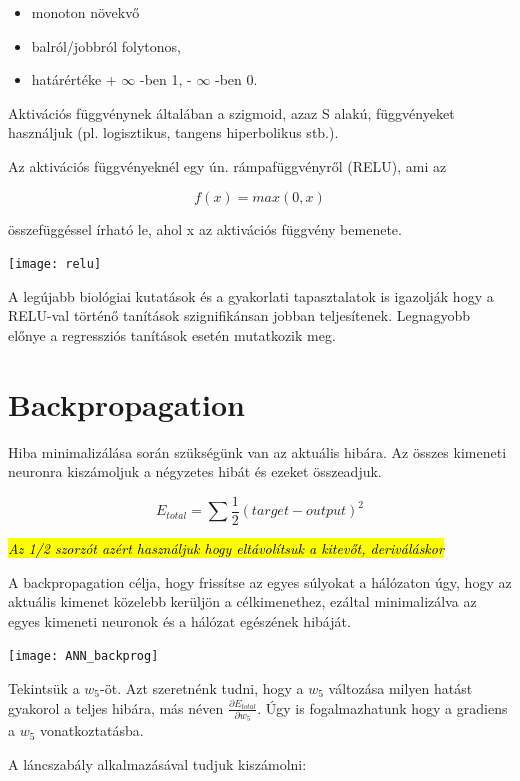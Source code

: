 \begin{itemize}
\item monoton növekvő
\item balról/jobbról folytonos,
\item határértéke + $\infty$ -ben 1, - $\infty$ -ben 0.
\end{itemize}

Aktivációs függvénynek általában a szigmoid, azaz S alakú, függvényeket használjuk (pl. logisztikus, tangens hiperbolikus stb.).

Az aktivációs függvényeknél egy ún. rámpafüggvényről (RELU), ami az

\[ f(x) = max(0,x) \]

összefüggéssel írható le, ahol x az aktivációs függvény bemenete.

\begin{center}
\texttt{[image: relu]}
\end{center}

A legújabb biológiai kutatások és a gyakorlati tapasztalatok is igazolják hogy a RELU-val történő tanítások szignifikánsan jobban teljesítenek. Legnagyobb előnye a regressziós tanítások esetén mutatkozik meg.

\section{Backpropagation}

Hiba minimalizálása során szükségünk van az aktuális hibára. Az összes kimeneti neuronra kiszámoljuk a négyzetes hibát és ezeket összeadjuk.

\[ E_{total} = \sum \dfrac{1}{2}(target - output)^2\]

\textit{\hl{Az 1/2 szorzót azért használjuk hogy eltávolítsuk a kitevőt, deriváláskor}
}

A backpropagation célja, hogy frissítse az egyes súlyokat a hálózaton úgy, hogy az aktuális kimenet közelebb kerüljön a célkimenethez, ezáltal minimalizálva az egyes kimeneti neuronok és a hálózat egészének hibáját.

\begin{center}
\texttt{[image: ANN\_backprog]}
\end{center}

Tekintsük a \(w_5\)-öt. Azt szeretnénk tudni, hogy a \(w_5\) változása milyen hatást gyakorol a teljes hibára, más néven $\frac{\partial E_ {total}}{\partial w_ {5}}$. Úgy is fogalmazhatunk hogy a gradiens a \(w_5\) vonatkoztatásba.

A láncszabály alkalmazásával tudjuk kiszámolni:

